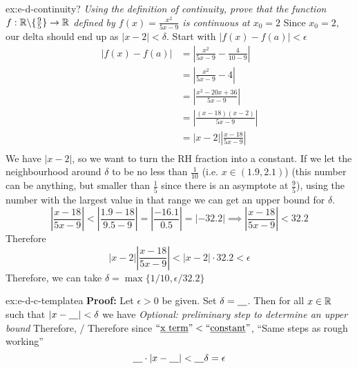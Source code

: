 \documentclass[landscape, 8pt]{extarticle}
\begin{document}
\begin{multicols}{3}
\begin{xmp}{ex:e-d-continuity}{?}
\textit{Using the definition of continuity, prove that the function $f: \mathbb{R}\backslash \{\frac{9}{5}\}\to \mathbb{R}$ defined by $f(x)=\frac{x^{2}}{5x-9}$ is continuous at $x_{0}= 2$}
Since $x_{0} = 2$, our delta should end up as $\lvert x-2\rvert < \delta$. Start with $\lvert f(x) - f(a)\rvert  < \epsilon$
\[\begin{aligned}
    \lvert f(x)-f(a) \rvert  & = \left\lvert  \frac{x^{2}}{5x-9}-\frac{4}{10-9}  \right\rvert \\
    &=\left\lvert  \frac{x^{2}}{5x-9}-4  \right\rvert \\
    &=\left\lvert  \frac{x^{2}-20x+36}{5x-9}  \right\rvert \\
    &=\left\lvert  \frac{(x-18)(x-2)}{5x-9}  \right\rvert  \\
    &= \lvert x-2 \rvert \left\lvert  \frac{x-18}{5x-9}  \right\rvert \\
\end{aligned}\]
We have $\lvert x-2\rvert$, so we want to turn the RH fraction into a constant. If we let the neighbourhood around $\delta$ to be no less than $\frac{1}{10}$ (i.e. $x\in(1.9, 2.1)$) (this number can be anything, but smaller than $\frac{1}{5}$ since there is an asymptote at $\frac{9}{5}$), using the number with the largest value in that range we can get an upper bound for $\delta$.
\[\left\lvert \frac{x-18}{5x-9}\right\rvert < \left\lvert \frac{1.9 - 18}{9.5 - 9}\right\rvert = \left\lvert \frac{-16.1}{0.5} \right\rvert = \left\lvert -32.2 \right\rvert \implies \left\lvert \frac{x-18}{5x-9}\right\rvert < 32.2\]
Therefore
\[\lvert x-2 \rvert \left\lvert  \frac{x-18}{5x-9}  \right\rvert < \lvert x-2 \rvert \cdot 32.2 < \epsilon\]
Therefore, we can take $\delta = \max \{1/10, \epsilon / 32.2\}$
\end{xmp}
\vspace{-5pt}

\begin{xmp}{ex:e-d-c-template}{a}
    \textbf{Proof:} Let $\epsilon > 0$ be given. Set $\delta = \text{\underline{\quad}}$. Then for all $x\in \mathbb{R}$ such that $\lvert x - \text{\underline{\quad}}\rvert < \delta$ we have
    \vspace{0pt}\newline
    \textit{Optional: preliminary step to determine an upper bound}
    \vspace{0pt}\newline
    Therefore, / Therefore since $\text{``\underline{x term}''} < \text{``\underline{constant}''}$,
    \vspace{0pt}\newline
    ``Same steps as rough working''
    \[\text{\underline{\quad}} \cdot \lvert x - \text{\underline{\quad}}\rvert < \text{\underline{\quad}}\delta = \epsilon\]
    \end{xmp}
    \vspace{-5pt}


\end{multicols}
\end{document}
